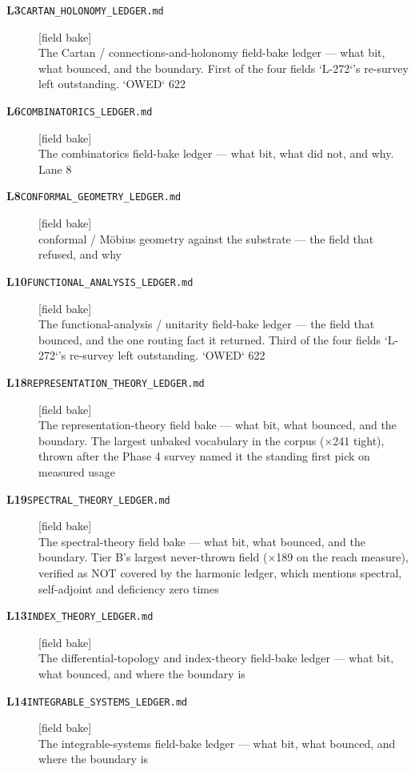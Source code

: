 \begin{description}
\item[\textbf{L3}\quad\texttt{CARTAN\_HOLONOMY\_LEDGER.md}]\hfill\textsf{[field bake]}\\
The Cartan / connections-and-holonomy field-bake ledger --- what bit, what bounced, and the boundary. First of the four fields `L-272`'s re-survey left outstanding. `OWED` 622
\item[\textbf{L6}\quad\texttt{COMBINATORICS\_LEDGER.md}]\hfill\textsf{[field bake]}\\
The combinatorics field-bake ledger --- what bit, what did not, and why. Lane 8
\item[\textbf{L8}\quad\texttt{CONFORMAL\_GEOMETRY\_LEDGER.md}]\hfill\textsf{[field bake]}\\
conformal / M\"obius geometry against the substrate --- the field that refused, and why
\item[\textbf{L10}\quad\texttt{FUNCTIONAL\_ANALYSIS\_LEDGER.md}]\hfill\textsf{[field bake]}\\
The functional-analysis / unitarity field-bake ledger --- the field that bounced, and the one routing fact it returned. Third of the four fields `L-272`'s re-survey left outstanding. `OWED` 622
\item[\textbf{L18}\quad\texttt{REPRESENTATION\_THEORY\_LEDGER.md}]\hfill\textsf{[field bake]}\\
The representation-theory field bake --- what bit, what bounced, and the boundary. The largest unbaked vocabulary in the corpus ($\times$241 tight), thrown after the Phase 4 survey named it the standing first pick on measured usage
\item[\textbf{L19}\quad\texttt{SPECTRAL\_THEORY\_LEDGER.md}]\hfill\textsf{[field bake]}\\
The spectral-theory field bake --- what bit, what bounced, and the boundary. Tier B's largest never-thrown field ($\times$189 on the reach measure), verified as NOT covered by the harmonic ledger, which mentions spectral, self-adjoint and deficiency zero times
\item[\textbf{L13}\quad\texttt{INDEX\_THEORY\_LEDGER.md}]\hfill\textsf{[field bake]}\\
The differential-topology and index-theory field-bake ledger --- what bit, what bounced, and where the boundary is
\item[\textbf{L14}\quad\texttt{INTEGRABLE\_SYSTEMS\_LEDGER.md}]\hfill\textsf{[field bake]}\\
The integrable-systems field-bake ledger --- what bit, what bounced, and where the boundary is
\end{description}
\endgroup
